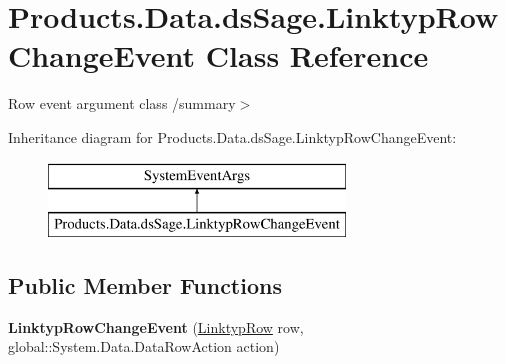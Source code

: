 \hypertarget{class_products_1_1_data_1_1ds_sage_1_1_linktyp_row_change_event}{}\section{Products.\+Data.\+ds\+Sage.\+Linktyp\+Row\+Change\+Event Class Reference}
\label{class_products_1_1_data_1_1ds_sage_1_1_linktyp_row_change_event}


Row event argument class /summary$>$  


Inheritance diagram for Products.\+Data.\+ds\+Sage.\+Linktyp\+Row\+Change\+Event\+:\begin{figure}[H]
\begin{center}
\leavevmode
\includegraphics[height=2.000000cm]{class_products_1_1_data_1_1ds_sage_1_1_linktyp_row_change_event}
\end{center}
\end{figure}
\subsection*{Public Member Functions}
\begin{DoxyCompactItemize}
\item 
{\bfseries Linktyp\+Row\+Change\+Event} (\hyperlink{class_products_1_1_data_1_1ds_sage_1_1_linktyp_row}{Linktyp\+Row} row, global\+::\+System.\+Data.\+Data\+Row\+Action action)\hypertarget{class_products_1_1_data_1_1ds_sage_1_1_linktyp_row_change_event_a998ce77fc22b525b8d646e2d0b3fd609}{}\label{class_products_1_1_data_1_1ds_sage_1_1_linktyp_row_change_event_a998ce77fc22b525b8d646e2d0b3fd609}

\end{DoxyCompactItemize}
